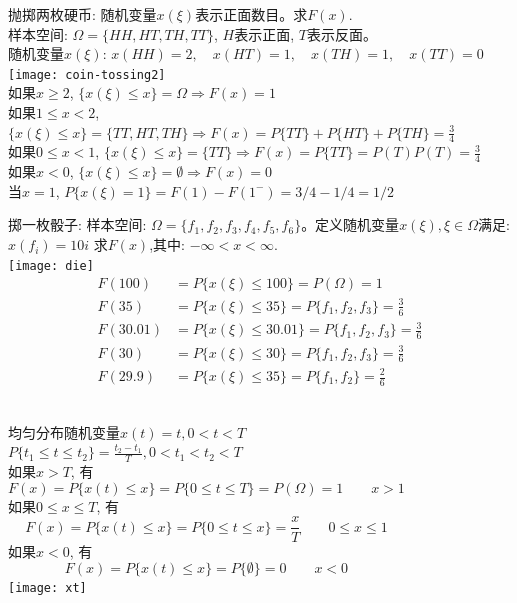 \begin{frame}[shrink]
抛掷两枚硬币: 随机变量$x(\xi)$表示正面数目。求$F(x)$.\\
样本空间: $\Omega=\{HH,HT,TH,TT\}$, $H$表示正面, $T$表示反面。\\
随机变量$x(\xi)$: $x(HH)=2,\quad x(HT)=1, \quad x(TH)=1, \quad x(TT)=0$
\texttt{[image: coin-tossing2]}\\
如果$x\ge 2$, $\{x(\xi)\le x\}=\Omega \Rightarrow F(x)=1$ \\
如果$1\le x<2$, $\{x(\xi)\le x\}=\{TT,HT,TH\} \Rightarrow F(x)=P\{TT\}+P\{HT\}+P\{TH\}=\frac{3}{4}$ \\
如果$0\le x<1$, $\{x(\xi)\le x\}=\{TT\} \Rightarrow F(x)=P\{TT\}=P(T)P(T)=\frac{3}{4}$ \\
如果$x<0$, $\{x(\xi)\le x \}=\emptyset \Rightarrow F(x)=0$ \\
当$x=1$, $P\{x(\xi)=1\}=F(1)-F(1^{-})=3/4-1/4=1/2$
\end{frame}

\begin{frame}[shrink]
掷一枚骰子: 样本空间: $\Omega=\{f_1,f_2,f_3,f_4,f_5,f_6\}$。定义随机变量$x(\xi),\xi\in \Omega$满足:$x(f_i)=10i$
求$F(x)$,其中: $-\infty<x<\infty$.\\
\texttt{[image: die]}
\begin{align*}
F(100)&=P\{x(\xi)\le 100 \}=P(\Omega)=1\\
F(35)&=P\{x(\xi)\le 35 \}=P\{f_1,f_2,f_3 \}=\frac{3}{6} \\
F(30.01)&=P\{x(\xi)\le 30.01 \}=P\{f_1,f_2,f_3 \}=\frac{3}{6} \\
F(30)&=P\{x(\xi)\le 30 \}=P\{f_1,f_2,f_3 \}=\frac{3}{6} \\
F(29.9)&=P\{x(\xi)\le 35 \}=P\{f_1,f_2 \}=\frac{2}{6} \\
\end{align*}
\end{frame}

\begin{frame}
\begin{columns}
	均匀分布随机变量$x(t)=t,0<t<T$\\
	$P\{t_1\le t\le t_2\}=\frac{t_2-t_1}{T},0<t_1<t_2<T$\\
	如果$x> T$, 有
	\[F(x)=P\{x(t)\le x \}=P\{0\le t\le T \}=P(\Omega)= 1\qquad x> 1 \] 
	如果$0\le x\le T$, 有
	\[F(x)=P\{x(t)\le x \}=P\{0\le t\le x\}=\frac{x}{T} \qquad 0\le x\le 1 \] 
	如果$x<0$, 有
	\[F(x)=P\{x(t)\le x \}=P\{\emptyset\}=0 \qquad x<0 \] 
	\texttt{[image: xt]}
\end{columns}
\end{frame}

